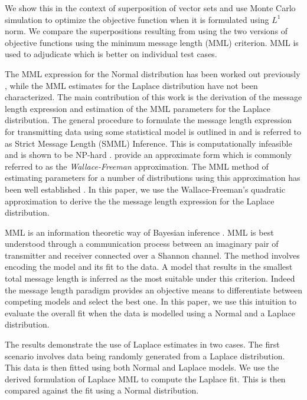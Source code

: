 \documentclass[wcp]{jmlr}
\begin{document}
We show this in the context of superposition of vector sets and use Monte Carlo simulation
to optimize the objective function when it is formulated using $L^1$ norm. We compare
the superpositions resulting from using the two versions of objective functions
using the minimum message length (MML) criterion. MML is used to adjudicate which is 
better on individual test cases. 

The MML expression for the Normal distribution has been 
worked out previously \citep{wallace68,WallaceBook}, while the MML estimates for the Laplace 
distribution have not been characterized. 
The main contribution of this work is the derivation of the message length 
expression and estimation of the MML parameters for the Laplace distribution.
The general procedure to formulate the message length expression for transmitting
data using some statistical model is outlined in \citet{wallace-87} and is 
referred to as Strict Message Length (SMML) Inference. This is computationally
infeasible and is shown to be NP-hard \citep{Farr01012002}. \citet{wallace-87}
provide an approximate form which is commonly referred to as the 
\emph{Wallace-Freeman} approximation. The MML method
of estimating parameters for a number of distributions using this approximation
has been well established \citep{WallaceBook}. In this paper, we use the 
Wallace-Freeman's quadratic approximation
to derive the the message length expression for the Laplace distribution. 

MML is an information theoretic way of Bayesian inference \citep{wallace68}. MML is best
understood through a communication process between an imaginary pair of transmitter
and receiver connected over a Shannon channel. The method involves
encoding the model and its fit to the data. A model that results in the smallest total message
length is inferred as the most suitable under this criterion. Indeed the message length
paradigm provides an objective means to differentiate between competing models
and select the best one. In this paper, we use this intuition to 
evaluate the overall fit when the data is modelled  using a Normal and a Laplace distribution. 

The results demonstrate the use of Laplace estimates in two cases. 
The first scenario involves data being randomly
generated from a Laplace distribution. This data is then fitted using
both Normal and Laplace models. We use the derived formulation of Laplace MML to
compute the Laplace fit. This is then compared against the fit using a Normal
distribution. 
\end{document}
